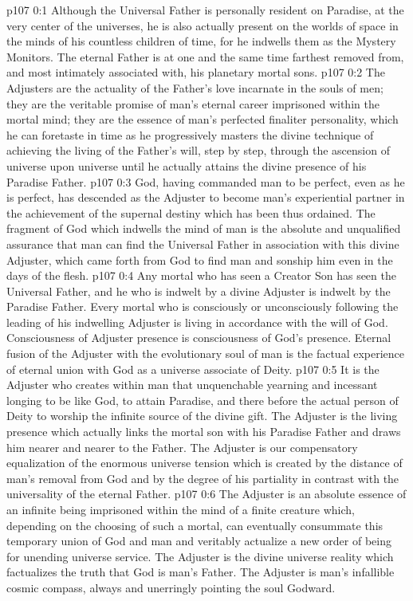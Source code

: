\author{Solitary Messenger}
\vs p107 0:1 Although the Universal Father is personally resident on Paradise, at the very center of the universes, he is also actually present on the worlds of space in the minds of his countless children of time, for he indwells them as the Mystery Monitors. The eternal Father is at one and the same time farthest removed from, and most intimately associated with, his planetary mortal sons.
\vs p107 0:2 The Adjusters are the actuality of the Father’s love incarnate in the souls of men; they are the veritable promise of man’s eternal career imprisoned within the mortal mind; they are the essence of man’s perfected finaliter personality, which he can foretaste in time as he progressively masters the divine technique of achieving the living of the Father’s will, step by step, through the ascension of universe upon universe until he actually attains the divine presence of his Paradise Father.
\vs p107 0:3 God, having commanded man to be perfect, even as he is perfect, has descended as the Adjuster to become man’s experiential partner in the achievement of the supernal destiny which has been thus ordained. The fragment of God which indwells the mind of man is the absolute and unqualified assurance that man can find the Universal Father in association with this divine Adjuster, which came forth from God to find man and sonship him even in the days of the flesh.
\vs p107 0:4 Any mortal who has seen a Creator Son has seen the Universal Father, and he who is indwelt by a divine Adjuster is indwelt by the Paradise Father. Every mortal who is consciously or unconsciously following the leading of his indwelling Adjuster is living in accordance with the will of God. Consciousness of Adjuster presence is consciousness of God’s presence. Eternal fusion of the Adjuster with the evolutionary soul of man is the factual experience of eternal union with God as a universe associate of Deity.
\vs p107 0:5 It is the Adjuster who creates within man that unquenchable yearning and incessant longing to be like God, to attain Paradise, and there before the actual person of Deity to worship the infinite source of the divine gift. The Adjuster is the living presence which actually links the mortal son with his Paradise Father and draws him nearer and nearer to the Father. The Adjuster is our compensatory equalization of the enormous universe tension which is created by the distance of man’s removal from God and by the degree of his partiality in contrast with the universality of the eternal Father.
\vs p107 0:6 The Adjuster is an absolute essence of an infinite being imprisoned within the mind of a finite creature which, depending on the choosing of such a mortal, can eventually consummate this temporary union of God and man and veritably actualize a new order of being for unending universe service. The Adjuster is the divine universe reality which factualizes the truth that God is man’s Father. The Adjuster is man’s infallible cosmic compass, always and unerringly pointing the soul Godward.
